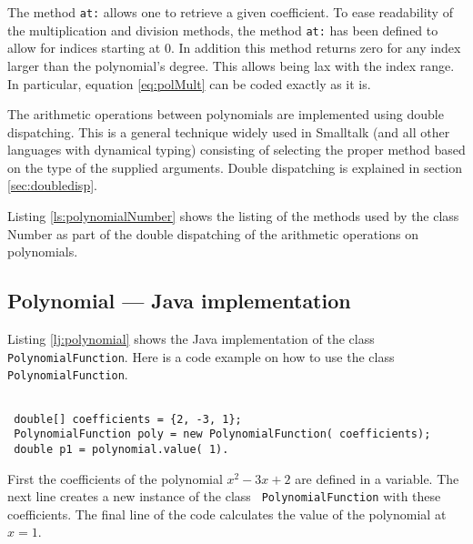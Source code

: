 \documentclass[twoside]{book}
\begin{document}
The method {\tt at:} allows one to retrieve a given coefficient.
To ease readability of the multiplication and division methods,
the method {\tt at:} has been defined to allow for indices
starting at 0. In addition this method returns zero for any index
larger than the polynomial's degree. This allows being lax with
the index range. In particular, equation \ref{eq:polMult} can be
coded exactly as it is.

The arithmetic operations between polynomials are implemented
using double dispatching. This is a general technique widely used
in Smalltalk (and all other languages with dynamical typing)
consisting of selecting the proper method based on the type of the
supplied arguments. Double dispatching is explained in section
\ref{sec:doubledisp}.


\begin{listing}
\label{ls:polynomial}

\end{listing}

Listing \ref{ls:polynomialNumber} shows the listing of the methods
used by the class Number as part of the double dispatching of the
arithmetic operations on polynomials.

\begin{listing}
\label{ls:polynomialNumber}

\end{listing}

\subsection{Polynomial --- Java implementation}
 Listing \ref{lj:polynomial} shows the Java
implementation of the class {\tt PolynomialFunction}. Here is a
code example on how to use the class {\tt PolynomialFunction}.
\begin{codeExample}
\begin{verbatim}

 double[] coefficients = {2, -3, 1};
 PolynomialFunction poly = new PolynomialFunction( coefficients);
 double p1 = polynomial.value( 1).
\end{verbatim}
\end{codeExample}
First the coefficients of the polynomial $x^2-3x+2$ are defined in
a variable. The next line creates a new instance of the class {\tt
PolynomialFunction} with these coefficients. The final line of the
code calculates the value of the polynomial at $x=1$.
\end{document}
